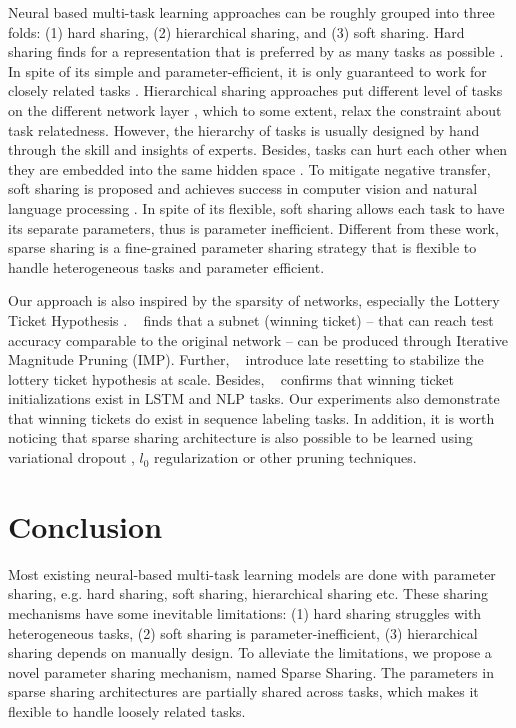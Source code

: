 \documentclass[letterpaper]{article} %
\newcommand{\citet}[1]{\citeauthor{#1}~\shortcite{#1}}
\begin{document}
Neural based multi-task learning approaches can be roughly grouped into three folds: (1) hard sharing, (2) hierarchical sharing, and (3) soft sharing. Hard sharing finds for a representation that is preferred by as many tasks as possible \cite{DBLP:journals/ml/Caruana97}. In spite of its simple and parameter-efficient, it is only guaranteed to work for closely related tasks \cite{DBLP:journals/jair/Baxter00}. Hierarchical sharing approaches put different level of tasks on the different network layer \cite{DBLP:conf/acl/SogaardG16,DBLP:conf/emnlp/HashimotoXTS17}, which to some extent, relax the constraint about task relatedness. However, the hierarchy of tasks is usually designed by hand through the skill and insights of experts. Besides, tasks can hurt each other when they are embedded into the same hidden space \cite{DBLP:conf/eacl/PlankA17}. To mitigate negative transfer, soft sharing is proposed and achieves success in computer vision \cite{DBLP:conf/cvpr/MisraSGH16} and natural language processing \cite{DBLP:conf/aaai/LiuFDQC19,DBLP:conf/aaai/RuderBAS19}. In spite of its flexible, soft sharing allows each task to have its separate parameters, thus is parameter inefficient. Different from these work, sparse sharing is a fine-grained parameter sharing strategy that is flexible to handle heterogeneous tasks and parameter efficient.

Our approach is also inspired by the sparsity of networks, especially the Lottery Ticket Hypothesis \cite{DBLP:conf/iclr/FrankleC19}. \citet{DBLP:conf/iclr/FrankleC19} finds that a subnet (winning ticket) -- that can reach test accuracy comparable to the original network -- can be produced through Iterative Magnitude Pruning (IMP). Further, \citet{frankle2019lottery} introduce late resetting to stabilize the lottery ticket hypothesis at scale. Besides, \citet{yu2019playing} confirms that winning ticket initializations exist in LSTM and NLP tasks. Our experiments also demonstrate that winning tickets do exist in sequence labeling tasks. In addition, it is worth noticing that sparse sharing architecture is also possible to be learned using variational dropout \cite{DBLP:conf/icml/MolchanovAV17}, $l_0$ regularization \cite{louizos2017learning} or other pruning techniques.

\section{Conclusion}
Most existing neural-based multi-task learning models are done with parameter sharing, e.g. hard sharing, soft sharing, hierarchical sharing etc. These sharing mechanisms have some inevitable limitations: (1) hard sharing struggles with heterogeneous tasks, (2) soft sharing is parameter-inefficient, (3) hierarchical sharing depends on manually design. To alleviate the limitations, we propose a novel parameter sharing mechanism, named Sparse Sharing. The parameters in sparse sharing architectures are partially shared across tasks, which makes it flexible to handle loosely related tasks.
\end{document}
